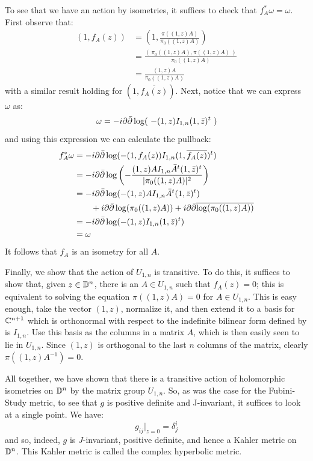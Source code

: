 To see that we have an action by isometries, it suffices to check that $f_A^{\ast} \omega = \omega$.  First observe that:
%
\begin{align*}
(1, f_A(z) ) &= \left( 1, \frac{ \pi( (1,z)A ) }{ \pi_0 ( (1,z)A ) } \right) \\
&= \frac{ ( \ \pi_0 ( (1,z)A ), \pi ( (1,z)A ) \ ) }{ \pi_0( (1,z)A ) } \\
&= \frac{ (1,z)A }{ \pi_0 ( (1,z)A ) }
\end{align*}
%
with a similar result holding for $( 1, \overline{ f_A (z) } )$.  Next, notice that we can express $\omega$ as:
%
$$ \omega = -i \partial \bar{\partial} \log( \ - (1,z) I_{1,n} (1, \bar{z})^{t} \ ) $$
%
and using this expression we can calculate the pullback:
%
\begin{align*}
f_A^{\ast} \omega &= - i \del \delbar \log ( - (1, f_A (z) ) I_{1,n} (1, \overline{ f_A (z) } )^{t} ) \\
%
&= -i \del \delbar \log \left( - \frac{ (1,z)A I_{1,n} \bar{A}^{t} (1, \bar{z})^{t} }{ | \pi_0 ( (1,z)A ) |^2 } \right) \\
%
&= - i \del \delbar \log ( - (1,z) A I_{1,n} \bar{A}^t (1, \bar{z})^{t} ) \\
& \quad \quad + i \del \delbar \log(  \pi_0 ( (1,z)A ) )  + i \del \delbar \overline{ \log( \pi_0 ( (1,z)A ) ) } \\
%
&= - i \del \delbar \log ( - (1,z) I_{1,n} (1, \bar{z})^{t} ) \\
%
&= \omega
\end{align*}
%
It follows that $f_A$ is an isometry for all $A$.

Finally, we show that the action of $U_{1,n}$ is transitive.  To do this, it suffices to show that, given $z \in \mathbb{D}^n$, there is an $A \in U_{1,n}$ such that $f_A (z) = 0$; this is equivalent to solving the equation $\pi( (1,z)A ) = 0$ for $A \in U_{1,n}$.  This is easy enough, take the vector $(1,z)$, normalize it, and then extend it to a basis for $\mathbb{C}^{n+1}$ which is orthonormal with respect to the indefinite bilinear form defined by is $I_{1,n}$.  Use this basis as the columns in a matrix $A$, which is then easily seen to lie in $U_{1,n}$.  Since $(1,z)$ is orthogonal to the last $n$ columns of the matrix, clearly $\pi ( (1,z)A^{-1} ) = 0$.

All together, we have shown that there is a transitive action of holomorphic isometries on $\mathbb{D}^n$ by the matrix group $U_{1,n}$.  So, as was the case for the Fubini-Study metric, to see that $g$ is positive definite and J-invariant, it suffices to look at a single point.  We have:
%
$$ g_{ij}|_{z=0} = \delta^i_j$$
%
and so, indeed, $g$ is $J$-invariant, positive definite, and hence a Kahler metric on $\mathbb{D}^n$.  This Kahler metric is called the complex hyperbolic metric.


